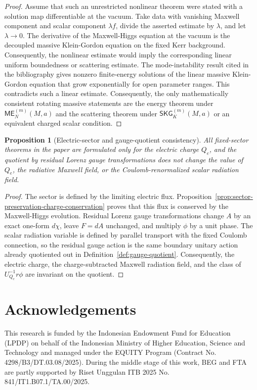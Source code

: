 \documentclass[11pt]{article}
\numberwithin{equation}{section}
\theoremstyle{plain}
\newtheorem{proposition}[theorem]{Proposition}
\theoremstyle{definition}
\theoremstyle{remark}
\newcommand{\SKG}{\mathsf{SKG}}
\newcommand{\ME}{\mathsf{ME}}
\begin{document}
\begin{proof}
Assume that such an unrestricted nonlinear theorem were stated with a solution map differentiable at the vacuum.  Take data with vanishing Maxwell component and scalar component \(\lambda f\), divide the asserted estimate by \(\lambda\), and let \(\lambda\to0\).  The derivative of the Maxwell-Higgs equation at the vacuum is the decoupled massive Klein-Gordon equation on the fixed Kerr background.  Consequently, the nonlinear estimate would imply the corresponding linear uniform boundedness or scattering estimate.  The mode-instability result cited in the bibliography gives nonzero finite-energy solutions of the linear massive Klein-Gordon equation that grow exponentially for open parameter ranges.  This contradicts such a linear estimate.  Consequently, the only mathematically consistent rotating massive statements are the energy theorem under \(\ME^{(m)}_N(M,a)\) and the scattering theorem under \(\SKG^{(m)}_K(M,a)\) or an equivalent charged scalar condition.
\end{proof}

\begin{proposition}[Electric-sector and gauge-quotient consistency]\label{prop:electric-gauge-consistency}
All fixed-sector theorems in the paper are formulated only for the electric charge \(Q_e\), and the quotient by residual Lorenz gauge transformations does not change the value of \(Q_e\), the radiative Maxwell field, or the Coulomb-renormalized scalar radiation field.
\end{proposition}

\begin{proof}
The sector is defined by the limiting electric flux.  Proposition~\ref{prop:sector-preservation-charge-conservation} proves that this flux is conserved by the Maxwell-Higgs evolution.  Residual Lorenz gauge transformations change \(A\) by an exact one-form \(d\chi\), leave \(F=dA\) unchanged, and multiply \(\phi\) by a unit phase.  The scalar radiation variable is defined by parallel transport with the fixed Coulomb connection, so the residual gauge action is the same boundary unitary action already quotiented out in Definition~\ref{def:gauge-quotient}.  Consequently, the electric charge, the charge-subtracted Maxwell radiation field, and the class of \(U_{Q_e}^{-1}r\phi\) are invariant on the quotient.
\end{proof}
\section*{Acknowledgements}
This research is funded by the Indonesian Endowment Fund for Education (LPDP) on behalf of the Indonesian Ministry of Higher Education, Science and Technology and managed under the EQUITY Program (Contract No. 4298/B3/DT.03.08/2025). During the middle stage of this work, BEG and FTA are partly supported by Riset Unggulan ITB 2025 No. 841/IT1.B07.1/TA.00/2025.
\end{document}
